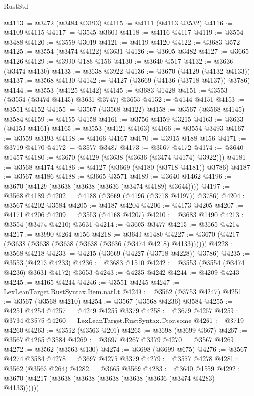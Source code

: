 \begin{lexlean}{RustStd}
\begin{coremodule}
@4113 := @3472 (@3484 @3193)
@4115 := @4111 (@4113 @3532)
@4116 := @4109 @4115
@4117 := @3545 @3600
@4118 := @4116 @4117
@4119 := @3554 @3488
@4120 := @3559 @3019
@4121 := @4119 @4120
@4122 := @3683 @572
@4125 := @3554 (@3474 @4122) @3631
@4126 := @3605 @3482
@4127 := @3665 @4126
@4129 := @3990 @188 @156
@4130 := @3640 @517
@4132 := @3636 (@3474 @4130)
@4133 := @3638 @3922
@4136 := @3670 (@4129 (@4132 @4133))
@4137 := @3568 @4130
@4142 := @4127 (@3669 (@4136 (@3718 @4137)) @3786)
@4144 := @3553 (@4125 @4142)
@4145 := @3683 @1428
@4151 := @3553 (@3554 (@3474 @4145) @3631 @3747) @3653
@4152 := @4144 @4151
@4153 := @3551 @4152
@4155 := @3567 (@3568 @4122)
@4158 := @3567 (@3568 @4145) @3584
@4159 := @4155 @4158
@4161 := @3756 @4159 @3265
@4163 := @3633 (@4153 @4161)
@4165 := @3553 (@4121 @4163)
@4166 := @3554 @3493
@4167 := @3559 @3193
@4168 := @4166 @4167
@4170 := @3915 @188 @156
@4171 := @3719 @4170
@4172 := @3577 @3487
@4173 := @3567 @4172
@4174 := @3640 @1457
@4180 := @3670 (@4129 (@3638 (@3636 (@3474 @4174) @3922)))
@4181 := @3568 @4174
@4186 := @4127 (@3669 (@4180 (@3718 @4181)) @3786)
@4187 := @3567 @4186
@4188 := @3665 @3571
@4189 := @3640 @1462
@4196 := @3670 (@4129 (@3638 (@3638 (@3636 (@3474 @4189) @3644))))
@4197 := @3568 @4189
@4202 := @4188 (@3669 (@4196 (@3718 @4197)) @3786)
@4204 := @3567 @4202 @3584
@4205 := @4187 @4204
@4206 := @4173 @4205
@4207 := @4171 @4206
@4209 := @3553 (@4168 @4207)
@4210 := @3683 @1490
@4213 := @3554 (@3474 @4210) @3631
@4214 := @3605 @3477
@4215 := @3665 @4214
@4217 := @3990 @264 @156
@4218 := @3640 @1480
@4227 := @3670 (@4217 (@3638 (@3638 (@3638 (@3638 (@3636 (@3474 @4218) @4133))))))
@4228 := @3568 @4218
@4233 := @4215 (@3669 (@4227 (@3718 @4228)) @3786)
@4235 := @3553 (@4213 @4233)
@4236 := @3683 @1510
@4242 := @3553 (@3554 (@3474 @4236) @3631 @4172) @3653
@4243 := @4235 @4242
@4244 := @4209 @4243
@4245 := @4165 @4244
@4246 := @3551 @4245
@4247 := LexLeanTarget.RustSyntax.Item.natLt
@4249 := @3562 (@3753 @4247)
@4251 := @3567 (@3568 @4210)
@4254 := @3567 (@3568 @4236) @3584
@4255 := @4251 @4254
@4257 := @4249 @4255 @3379
@4258 := @3679 @4257
@4259 := @3734 @3575
@4260 := LexLeanTarget.RustSyntax.Ctor.some
@4261 := @3719 @4260
@4263 := @3562 (@3563 @201)
@4265 := @3698 (@3699 @667)
@4267 := @3567 @4265 @3584
@4269 := @3697 @4267 @3379
@4270 := @3567 @4269
@4272 := @3562 (@3563 @130)
@4274 := @3698 (@3699 @675)
@4276 := @3567 @4274 @3584
@4278 := @3697 @4276 @3379
@4279 := @3567 @4278
@4281 := @3562 (@3563 @264)
@4282 := @3665 @3569
@4283 := @3640 @1559
@4292 := @3670 (@4217 (@3638 (@3638 (@3638 (@3638 (@3636 (@3474 @4283) @4133))))))

\end{coremodule}
\end{lexlean}
